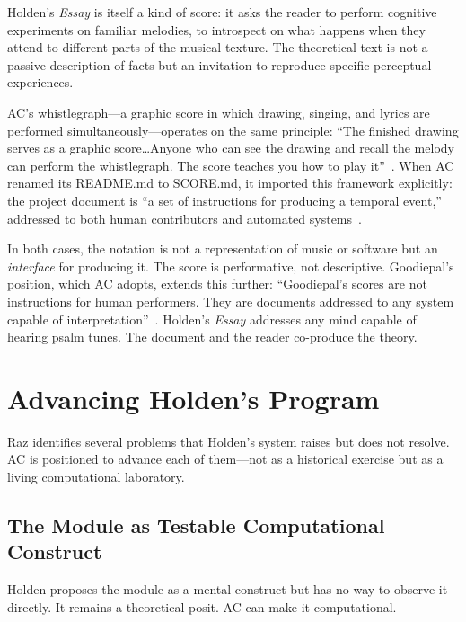 \documentclass[10pt,letterpaper,twocolumn]{article}
\begin{document}
Holden's \emph{Essay} is itself a kind of score: it asks the reader to perform cognitive experiments on familiar melodies, to introspect on what happens when they attend to different parts of the musical texture. The theoretical text is not a passive description of facts but an invitation to reproduce specific perceptual experiences.

AC's whistlegraph---a graphic score in which drawing, singing, and lyrics are performed simultaneously---operates on the same principle: ``The finished drawing serves as a graphic score\ldots Anyone who can see the drawing and recall the melody can perform the whistlegraph. The score teaches you how to play it''~\citep{acwhistlegraph2026}. When AC renamed its README.md to SCORE.md, it imported this framework explicitly: the project document is ``a set of instructions for producing a temporal event,'' addressed to both human contributors and automated systems~\citep{acscore2026}.

In both cases, the notation is not a representation of music or software but an \emph{interface} for producing it. The score is performative, not descriptive. Goodiepal's position, which AC adopts, extends this further: ``Goodiepal's scores are not instructions for human performers. They are documents addressed to any system capable of interpretation''~\citep{acgoodiepal2026}. Holden's \emph{Essay} addresses any mind capable of hearing psalm tunes. The document and the reader co-produce the theory.

\section{Advancing Holden's Program}
\label{sec:advancing}

Raz identifies several problems that Holden's system raises but does not resolve. AC is positioned to advance each of them---not as a historical exercise but as a living computational laboratory.

\subsection{The Module as Testable Computational Construct}

Holden proposes the module as a mental construct but has no way to observe it directly. It remains a theoretical posit. AC can make it computational.
\end{document}
